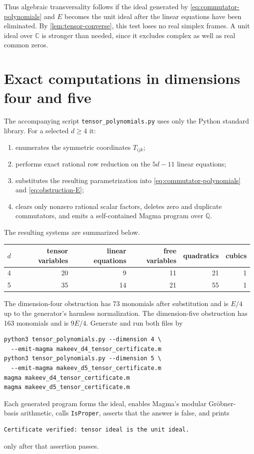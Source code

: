 \documentclass[11pt,reqno]{amsart}
\theoremstyle{remark}
\newcommand{\C}{\mathbb C}
\newcommand{\Q}{\mathbb Q}
\begin{document}
Thus algebraic transversality follows if the ideal generated by
\eqref{eq:commutator-polynomials} and $E$ becomes the unit ideal after the
linear equations have been eliminated.  By \cref{lem:tensor-converse}, this
test loses no real simplex frames.  A unit ideal over $\C$ is stronger than
needed, since it excludes complex as well as real common zeros.

\section{Exact computations in dimensions four and five}
\label{sec:computations}

The accompanying script \texttt{tensor\_polynomials.py} uses only the Python
standard library.  For a selected $d\ge4$ it:
\begin{enumerate}
\item enumerates the symmetric coordinates $T_{ijk}$;
\item performs exact rational row reduction on the $5d-11$ linear equations;
\item substitutes the resulting parametrization into
      \eqref{eq:commutator-polynomials} and \eqref{eq:obstruction-E};
\item clears only nonzero rational scalar factors, deletes zero and duplicate
      commutators, and emits a self-contained Magma program over $\Q$.
\end{enumerate}
The resulting systems are summarized below.

\begin{center}
\begin{tabular}{@{}c@{\quad}r@{\quad}r@{\quad}r@{\quad}r@{\quad}r@{}}
\toprule
$d$&tensor variables&linear equations&free variables&quadratics&cubics\\
\midrule
4&20&9&11&21&1\\
5&35&14&21&55&1\\
\bottomrule
\end{tabular}
\end{center}

The dimension-four obstruction has 73 monomials after substitution and is
$E/4$ up to the generator's harmless normalization.  The dimension-five
obstruction has 163 monomials and is $9E/4$.  Generate and run both files by
\begin{lstlisting}[style=certificate]
python3 tensor_polynomials.py --dimension 4 \
  --emit-magma makeev_d4_tensor_certificate.m
python3 tensor_polynomials.py --dimension 5 \
  --emit-magma makeev_d5_tensor_certificate.m
magma makeev_d4_tensor_certificate.m
magma makeev_d5_tensor_certificate.m
\end{lstlisting}
Each generated program forms the ideal, enables Magma's modular
Gr\"obner-basis arithmetic, calls \texttt{IsProper}, asserts that the answer
is false, and prints
\begin{verbatim}
Certificate verified: tensor ideal is the unit ideal.
\end{verbatim}
only after that assertion passes.
\end{document}
